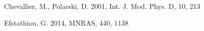 \documentclass[iop]{emulateapj}
\begin{document}
\begin{thebibliography}{}



Chevallier, M., Polarski, D. 2001, Int. J. Mod. Phys. D, 10, 213











Efstathiou, G. 2014, MNRAS, 440, 1138






\end{thebibliography}
\end{document}
